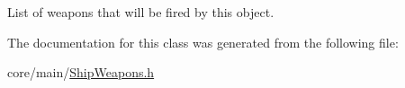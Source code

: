 List of weapons that will be fired by this object. 



The documentation for this class was generated from the following file\-:\begin{DoxyCompactItemize}
\item 
core/main/\hyperlink{ShipWeapons_8h}{Ship\-Weapons.\-h}\end{DoxyCompactItemize}
